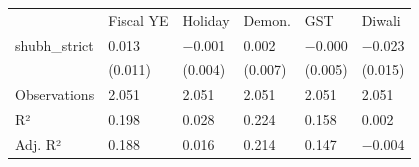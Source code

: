 \begin{tabular}{llllll}
& Fiscal YE & Holiday & Demon. & GST & Diwali \\
shubh\_strict & \num{0.013} & \num{-0.001} & \num{0.002} & \num{-0.000} & \num{-0.023} \\
& (\num{0.011}) & (\num{0.004}) & (\num{0.007}) & (\num{0.005}) & (\num{0.015}) \\
Observations & \num{2,051} & \num{2,051} & \num{2,051} & \num{2,051} & \num{2,051} \\
R² & \num{0.198} & \num{0.028} & \num{0.224} & \num{0.158} & \num{0.002} \\
Adj. R² & \num{0.188} & \num{0.016} & \num{0.214} & \num{0.147} & \num{-0.004} \\
\end{tabular}
